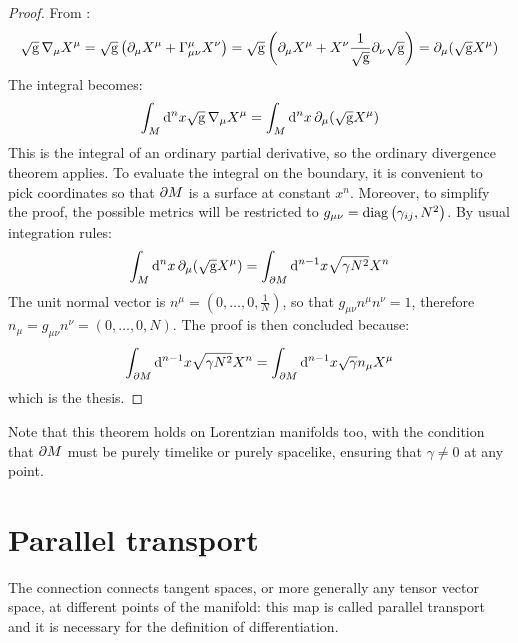 \begin{proofbox}
  \begin{proof}
    From :
    \begin{equation*}
      \sqrt{\mathrm{g}}\, \nabla_\mu X^\mu = \sqrt{\mathrm{g}} \left( \partial_\mu X^\mu + \Gamma^\mu_{\mu \nu} X^\nu \right) = \sqrt{\mathrm{g}} \left( \partial_\mu X^\mu + X^\nu \frac{1}{\sqrt{\mathrm{g}}} \partial_\nu \sqrt{\mathrm{g}} \right) = \partial_\mu ( \sqrt{\mathrm{g}} X^\mu )
    \end{equation*}
    The integral becomes:
    \begin{equation*}
      \int_M \mathrm{d}^n x \sqrt{\mathrm{g}}\, \nabla_\mu X^\mu = \int_M \mathrm{d}^n x\, \partial_\mu (\sqrt{\mathrm{g}} X^\mu)
    \end{equation*}
    This is the integral of an ordinary partial derivative, so the ordinary divergence theorem applies. To evaluate the integral on the boundary, it is convenient to pick coordinates so that $ \partial M $ is a surface at constant $ x^n $. Moreover, to simplify the proof, the possible metrics will be restricted to $ g_{\mu \nu} = \operatorname{diag} \left( \gamma_{ij}, N^2 \right) $. By usual integration rules:
    \begin{equation*}
      \int_M \mathrm{d}^n x\, \partial_\mu ( \sqrt{\mathrm{g}} X^\mu) = \int_{\partial M} \mathrm{d}^{n-1} x \sqrt{\gamma N^2} X^n
    \end{equation*}
    The unit normal vector is $ n^\mu = (0,\dots,0,\frac{1}{N}) $, so that $ g_{\mu \nu} n^\mu n^\nu = 1 $, therefore $ n_\mu = g_{\mu \nu} n^\nu = (0,\dots,0,N) $. The proof is then concluded because:
    \begin{equation*}
      \int_{\partial M} \mathrm{d}^{n-1} x\sqrt{\gamma N^2} X^n = \int_{\partial M} \mathrm{d}^{n-1} x \sqrt{\gamma} n_\mu X^\mu
    \end{equation*}
    which is the thesis.
  \end{proof}
\end{proofbox}

Note that this theorem holds on Lorentzian manifolds too, with the condition that $ \partial M $ must be purely timelike or purely spacelike, ensuring that $ \gamma \neq 0 $ at any point.

\section{Parallel transport}


The connection connects tangent spaces, or more generally any tensor vector space, at different points of the manifold: this map is called parallel transport and it is necessary for the definition of differentiation.

